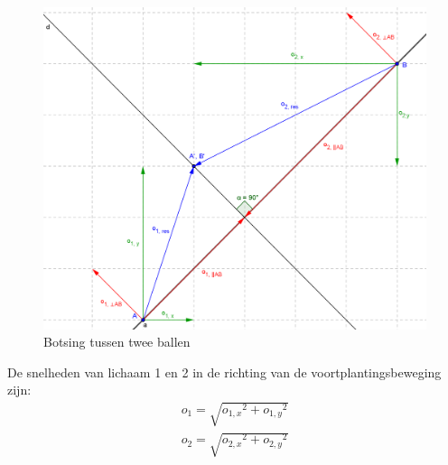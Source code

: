 \documentclass[12pt,a4paper]{article}
\begin{document}
	\begin{figure}[H]
		\centerline{\includegraphics[width=\textwidth]{Plaatjes/niet-centrale-botsing.png}}
		\caption{Botsing tussen twee ballen}
		\label{niet-centrale botsing}
	\end{figure}

	De snelheden van lichaam 1 en 2  in de richting van de voortplantingsbeweging zijn:
	\begin{equation}
		\begin{aligned}
			o_1=\sqrt{{o_{1,x}}^2+{{o_{1,y}}^2}}\\
			o_2=\sqrt{{o_{2,x}}^2+{{o_{2,y}}^2}}\\
		\end{aligned}
	\end{equation}
\end{document}
